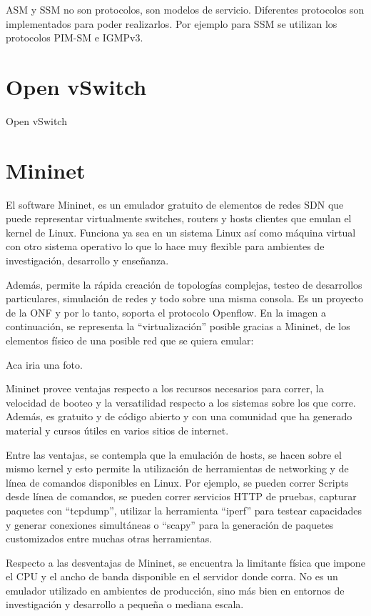 \documentclass[12pt,a4paper,oneside]{book}
\begin{document}
ASM y SSM no son protocolos, son modelos de servicio. Diferentes protocolos son implementados para poder realizarlos. Por ejemplo para SSM se utilizan los protocolos PIM-SM e IGMPv3.


\section{Open vSwitch}
\label{marco_openvswitch}
Open vSwitch

\section{Mininet}
\label{marco_mininet}
El software Mininet, es un emulador gratuito de elementos de redes SDN que puede representar virtualmente switches, routers y hosts clientes que emulan el kernel de Linux. Funciona  ya sea en un sistema Linux así como máquina virtual con otro sistema operativo lo que lo hace muy flexible para ambientes de investigación, desarrollo y enseñanza.

Además, permite la rápida creación de topologías complejas, testeo de desarrollos particulares, simulación de redes y todo sobre una misma consola. Es un proyecto de la ONF y por lo tanto, soporta el protocolo Openflow. En la imagen a continuación, se representa la “virtualización” posible gracias a Mininet, de los elementos físico de una posible red que se quiera emular:

Aca iria una foto.

Mininet provee ventajas respecto a los recursos necesarios para correr, la velocidad de booteo y la versatilidad respecto a los sistemas sobre los que corre. Además, es gratuito y de código abierto y con una comunidad que ha generado material y cursos útiles en varios sitios de internet.

Entre las ventajas, se contempla que la emulación de hosts, se hacen sobre el mismo kernel y esto permite la utilización de herramientas de networking y de línea de comandos disponibles en Linux. Por ejemplo, se pueden correr Scripts desde línea de comandos, se pueden correr servicios HTTP de pruebas, capturar paquetes con “tcpdump”, utilizar la herramienta “iperf” para testear capacidades y generar conexiones simultáneas o “scapy” para la generación de paquetes customizados entre muchas otras herramientas.

Respecto a las desventajas de Mininet, se encuentra la limitante física que impone el CPU y el ancho de banda disponible en el servidor donde corra. No es un emulador utilizado en ambientes de producción, sino más bien en entornos de investigación y desarrollo a pequeña o mediana escala.
\end{document}
